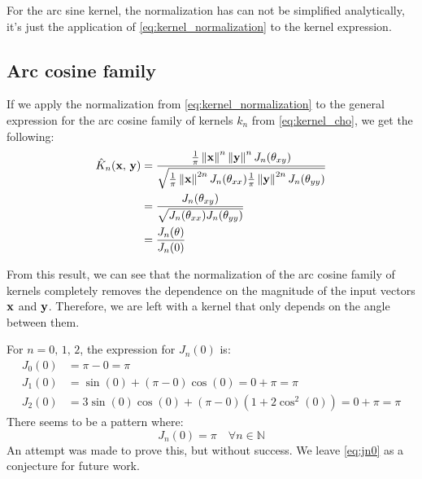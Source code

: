 For the arc sine kernel, the normalization has can not be simplified analytically,
it's just the application of \cref{eq:kernel_normalization} to the kernel expression.

\subsection{Arc cosine family}%
\label{sub:kernel_normalization_acos}

If we apply the normalization from \cref{eq:kernel_normalization} to the
general expression for the arc cosine family of kernels $k_n$ from
\cref{eq:kernel_cho}, we get the following:
\begin{align}
    \hat{K}_n(\mathbf{x},\,\mathbf{y}) & = \frac{
        \frac{1}{\pi} \left\lVert \mathbf{x} \right\rVert^n \left\lVert \mathbf{y} \right\rVert^n J_n(\theta_{xy})
    }{\sqrt{
            \frac{1}{\pi} \left\lVert \mathbf{x} \right\rVert^{2n} J_n(\theta_{xx})
            \frac{1}{\pi} \left\lVert \mathbf{y} \right\rVert^{2n} J_n(\theta_{yy})
    }}                                                                                        \\
                       & = \frac{ J_n(\theta_{xy}) }{\sqrt{ J_n(\theta_{xx}) J_n(\theta_{yy})
    }}                                                                                        \\
                       & = \frac{ J_n(\theta) }{J_n(0)}
\end{align}

From this result, we can see that the normalization of the arc cosine family of kernels
completely removes the dependence on the magnitude of the input vectors $\mathbf{x}$ and $\mathbf{y}$.
Therefore, we are left with a kernel that only depends on the angle between them.

For $n = 0,\,1,\,2$, the expression for $J_n(0)$ is:
\begin{align}
    J_0(0) & = \pi - 0 = \pi                                                          \\
    J_1(0) & = \sin(0) + (\pi - 0)\cos(0) = 0 + \pi = \pi                             \\
    J_2(0) & = 3\sin(0)\cos(0) + (\pi - 0)\left(1 + 2\cos^2(0)\right) = 0 + \pi = \pi
\end{align}
There seems to be a pattern where:
\begin{equation}
    J_n(0) = \pi\quad \forall n \in \mathbb{N} \label{eq:jn0}
\end{equation}
An attempt was made to prove this, but without success.
We leave \cref{eq:jn0} as a conjecture for future work.

